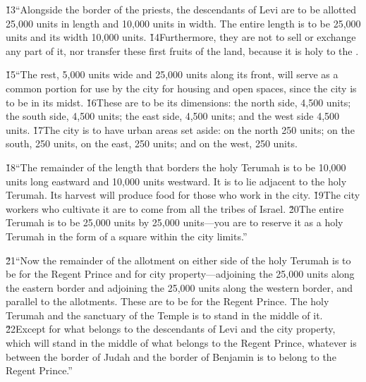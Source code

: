 \v{13}``Alongside the border of the priests, the descendants of Levi are to be allotted 25,000 units in length and 10,000 units in width. The entire length is to be 25,000 units and its width 10,000 units. \v{14}Furthermore, they are not to sell or exchange any part of it, nor transfer these first fruits of the land, because it is holy to the .

\v{15}``The rest, 5,000 units wide and 25,000 units along its front, will serve as a common portion for use by the city for housing and open spaces, since the city is to be in its midst. \v{16}These are to be its dimensions: the north side, 4,500 units; the south side, 4,500 units; the east side, 4,500 units; and the west side 4,500 units. \v{17}The city is to have urban areas set aside: on the north 250 units; on the south, 250 units, on the east, 250 units; and on the west, 250 units.

\v{18}``The remainder of the length that borders the holy Terumah is to be 10,000 units long eastward and 10,000 units westward. It is to lie adjacent to the holy Terumah. Its harvest will produce food for those who work in the city. \v{19}The city workers who cultivate it are to come from all the tribes of Israel. \v{20}The entire Terumah is to be 25,000 units by 25,000 units---you are to reserve it as a holy Terumah in the form of a square within the city limits.''

\v{21}``Now the remainder of the allotment on either side of the holy Terumah is to be for the Regent Prince and for city property---adjoining the 25,000 units along the eastern border and adjoining the 25,000 units along the western border, and parallel to the allotments. These are to be for the Regent Prince. The holy Terumah and the sanctuary of the Temple is to stand in the middle of it. \v{22}Except for what belongs to the descendants of Levi and the city property, which will stand in the middle of what belongs to the Regent Prince, whatever is between the border of Judah and the border of Benjamin is to belong to the Regent Prince.''

